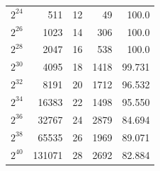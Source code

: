 \documentclass[runningheads]{llncs}
\begin{document}
\begin{table}[!t]
\begin{tabular}{rrrrr}
		\rowcolor[HTML]{FFFFFF} 
		$2^{24}$                                                              & 511                                                                              & 12                           & 49                        & 100.0                          \\
		\rowcolor[HTML]{FFFFFF} 
		$2^{26}$                                                             & 1023                                                                             & 14                           & 306                       & 100.0                          \\
		\rowcolor[HTML]{FFFFFF} 
		$2^{28}$                                                              & 2047                                                                             & 16                           & 538                       & 100.0                          \\
		\rowcolor[HTML]{FFFFFF} 
		$2^{30}$                                                              & 4095                                                                             & 18                           & 1418                      & 99.731                       \\
		\rowcolor[HTML]{FFFFFF} 
		$2^{32}$                                                              & 8191                                                                             & 20                           & 1712                      & 96.532                       \\
		\rowcolor[HTML]{FFFFFF} 
		$2^{34}$                                                              & 16383                                                                            & 22                           & 1498                      & 95.550                       \\
		\rowcolor[HTML]{FFFFFF} 
		$2^{36}$                                                              & 32767                                                                            & 24                           & 2879                      & 84.694                       \\
		\rowcolor[HTML]{FFFFFF} 
		$2^{38}$                                                              & 65535                                                                            & 26                           & 1969                      & 89.071                       \\
		\rowcolor[HTML]{FFFFFF} 
		$2^{40}$                                                              & 131071                                                                           & 28                           & 2692                      & 82.884                       \\

\end{tabular}
\end{table}
\end{document}
